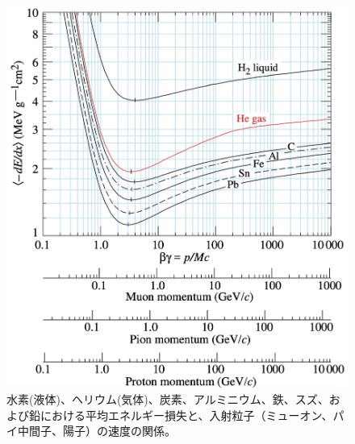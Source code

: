  \begin{figure}[h]
	\begin{center}
 \includegraphics[keepaspectratio, scale=0.4]
 	{Figure/Siwecal/dedx.png}
 		\caption{水素(液体)、ヘリウム(気体)、炭素、アルミニウム、鉄、スズ、および鉛における平均エネルギー損失と、入射粒子（ミューオン、パイ中間子、陽子）の速度の関係。}
 		\label{dE/dx}
	\end{center}
 \end{figure}

